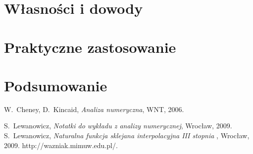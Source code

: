 \documentclass[11pt,leqno]{article}
\begin{document}
\section{Własności i dowody}
\setcounter{equation}{0}



\section{Praktyczne zastosowanie}                       
\setcounter{equation}{0}


\section{Podsumowanie}                       
\setcounter{equation}{0}




\thispagestyle{empty}
\begin{thebibliography}{99}

 W.~Cheney, D.~Kincaid, \textit{Analiza numeryczna\/}, WNT, 2006.

   S.~Lewanowicz, \textit{Notatki do wykładu z analizy numerycznej},
              Wrocław, 2009.
 S.~Lewanowicz, \textit{Naturalna funkcja sklejana interpolacyjna III stopnia },
              Wrocław, 2009. 
 http://wazniak.mimuw.edu.pl/.

	  
\end{thebibliography}
\end{document}
